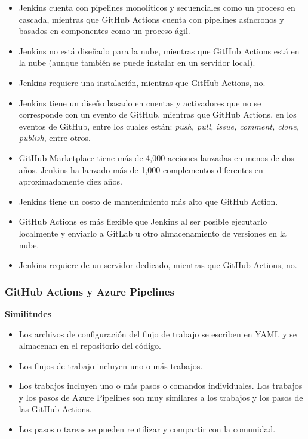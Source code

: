 \documentclass[twoside,twocolumn]{article}
\begin{document}
\begin{itemize}
    \item Jenkins cuenta con pipelines monolíticos y secuenciales como un proceso en cascada, mientras que GitHub Actions cuenta con pipelines asíncronos y basados en componentes como un proceso ágil.
    \item Jenkins no está diseñado para la nube, mientras que GitHub Actions está en la nube (aunque también se puede instalar en un servidor local).
    \item Jenkins requiere una instalación, mientras que GitHub Actions, no.
    \item Jenkins tiene un diseño basado en cuentas y activadores que no se corresponde con un evento de GitHub, mientras que GitHub Actions, en los eventos de GitHub, entre los cuales están: \textit{push, pull, issue, comment, clone, publish}, entre otros.
    \item GitHub Marketplace tiene más de 4,000 acciones lanzadas en menos de dos años. Jenkins ha lanzado más de 1,000 complementos diferentes en aproximadamente diez años.
    \item Jenkins tiene un costo de mantenimiento más alto que GitHub Action.
    \item GitHub Actions es más flexible que Jenkins al ser posible ejecutarlo localmente y enviarlo a GitLab u otro almacenamiento de versiones en la nube.
    \item Jenkins requiere de un servidor dedicado, mientras que GitHub Actions, no.
\end{itemize}

\subsubsection{GitHub Actions y Azure Pipelines}

\textbf{Similitudes}

\begin{itemize}
    \item Los archivos de configuración del flujo de trabajo se escriben en YAML y se almacenan en el repositorio del código.
    \item Los flujos de trabajo incluyen uno o más trabajos.
    \item Los trabajos incluyen uno o más pasos o comandos individuales. Los trabajos y los pasos de Azure Pipelines son muy similares a los trabajos y los pasos de las GitHub Actions.
    \item Los pasos o tareas se pueden reutilizar y compartir con la comunidad.
\end{itemize}
\end{document}
